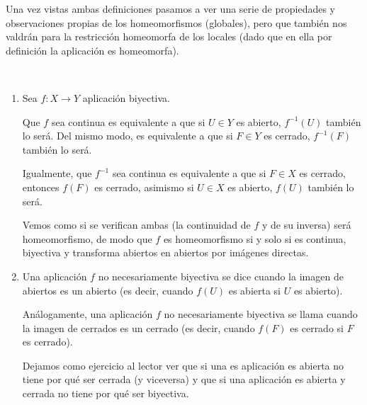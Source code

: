 Una vez vistas ambas definiciones pasamos a ver una serie de propiedades y observaciones propias de los homeomorfismos (globales), pero que también nos valdrán para la restricción homeomorfa de los locales (dado que en ella por definición la aplicación es homeomorfa).
\label{etop_obs_homeomorfismo}
\begin{obs}\
	\begin{enumerate}
		\item 
		Sea $f:X\rightarrow Y$ aplicación biyectiva.
		
		Que $f$ sea continua es equivalente a que si $U\in Y$ es abierto, $f^{-1}(U)$ también lo será. Del mismo modo, es equivalente a que si $F\in Y$ es cerrado, $f^{-1}(F)$ también lo será.
		
		Igualmente, que $f^{-1}$ sea continua es equivalente a que si $F\in X$ es cerrado, entonces $f(F)$ es cerrado, asimismo si $U\in X$ es abierto, $f(U)$ también lo será.
		
		Vemos como si se verifican ambas (la continuidad de $f$ y de su inversa) será homeomorfismo, de modo que $f$ es homeomorfismo si y solo si es continua, biyectiva y transforma abiertos en abiertos por imágenes directas.
		
		\item
		Una aplicación $f$ no necesariamente biyectiva se dice  cuando la imagen de abiertos es un abierto (es decir, cuando $f(U)$ es abierta si $U$ es abierto).
		
		Análogamente, una aplicación $f$ no necesariamente biyectiva se llama  cuando la imagen de cerrados es un cerrado (es decir, cuando $f(F)$ es cerrado si $F$ es cerrado).
		
		Dejamos como ejercicio al lector ver que si una es aplicación es abierta no tiene por qué ser cerrada (y viceversa) y que si una aplicación es abierta y cerrada no tiene por qué ser biyectiva.\qedhere
		\end{enumerate}
\end{obs}
